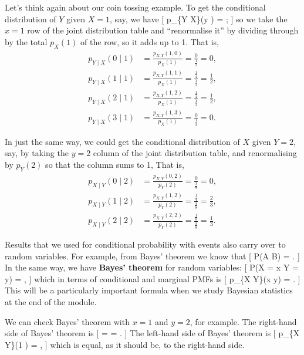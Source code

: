 \documentclass[
  letterpaper,
  DIV=11,
  numbers=noendperiod]{scrreprt}
\theoremstyle{remark}
\begin{document}
Let's think again about our coin tossing example. To get the conditional
distribution of \(Y\) given \(X = 1\), say, we have {[} p\_\{Y
\mid X\}(y ) =  ; {]} so we take the
\(x = 1\) row of the joint distribution table and ``renormalise it'' by
dividing through by the total \(p_X(1)\) of the row, so it adds up to 1.
That is, \begin{align*}
  p_{Y \mid X} (0 \mid 1) &= \frac{p_{X,Y}(1, 0)}{p_X(1)} = \frac{0}{\frac12} = 0 , \\
  p_{Y \mid X} (1 \mid 1) &= \frac{p_{X,Y}(1, 1)}{p_X(1)} = \frac{\frac14}{\frac12} = \tfrac12 , \\
  p_{Y \mid X} (2 \mid 1) &= \frac{p_{X,Y}(1, 2)}{p_X(1)} = \frac{\frac14}{\frac12} = \tfrac12 , \\
  p_{Y \mid X} (3 \mid 1) &= \frac{p_{X,Y}(1, 3)}{p_X(1)} = \frac{0}{\frac12} = 0 .
\end{align*}

In just the same way, we could get the conditional distribution of \(X\)
given \(Y = 2\), say, by taking the \(y = 2\) column of the joint
distribution table, and renormalising by \(p_Y(2)\) so that the column
sums to 1, That is, \begin{align*}
  p_{X \mid Y} (0 \mid 2) &= \frac{p_{X,Y}(0,2)}{p_Y(2)} = \frac{0}{\frac38} = 0 , \\
  p_{X \mid Y} (1 \mid 2) &= \frac{p_{X,Y}(1,2)}{p_Y(2)} = \frac{\frac14}{\frac38} = \tfrac23 , \\
  p_{X \mid Y} (2 \mid 2) &= \frac{p_{X,Y}(2,2)}{p_Y(2)} = \frac{\frac18}{\frac38} = \tfrac13 .
\end{align*}

Results that we used for conditional probability with events also carry
over to random variables. For example, from Bayes' theorem we know that
{[} \mathbb P(A \mid B) =
 . {]} In the
same way, we have \textbf{Bayes' theorem} for random variables: {[}
\mathbb P(X = x \mid Y = y) =
, {]} which in terms of conditional and marginal PMFs is {[} p\_\{X
\mid Y\}(x \mid y) =  .
{]} This will be a particularly important formula when we study Bayesian
statistics at the end of the module.

We can check Bayes' theorem with \(x = 1\) and \(y = 2\), for example.
The right-hand side of Bayes' theorem is {[}
 =
 =  . {]} The
left-hand side of Bayes' theorem is {[} p\_\{X \mid Y\}(1 ) =
 , {]} which is equal, as it should be, to the right-hand side.
\end{document}
